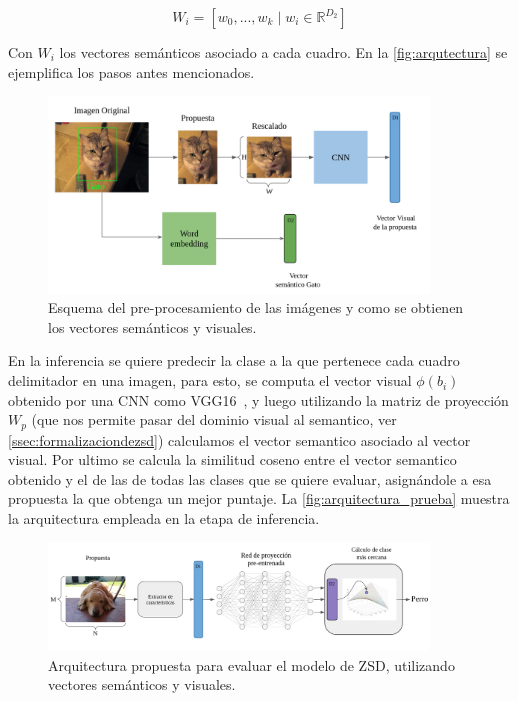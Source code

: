 \[W_i = [w_0,...,w_k \mid w_i \in \mathbb{R}^{D_2}]\]

Con $W_i$ los vectores semánticos asociado a cada cuadro. En la \autoref{fig:arqutectura} se ejemplifica los pasos antes mencionados.


\begin{figure}
	\centering
	\includegraphics[width=0.9\textwidth]{img/arquitectura.png}
	\caption{Esquema del pre-procesamiento de las imágenes y como se obtienen los vectores semánticos y visuales.}
	\label{fig:arqutectura}
\end{figure}


En la inferencia se quiere predecir la clase a la que pertenece cada cuadro delimitador en una imagen, para esto, se computa el vector visual $\phi(b_i)$ obtenido por una CNN como VGG16~\cite{simonyan2014very}, y luego utilizando la matriz de proyección $W_p$ (que nos permite pasar del dominio visual al semantico, ver \autoref{ssec:formalizaciondezsd}) calculamos el vector semantico asociado al vector visual. Por ultimo se calcula la similitud coseno entre el vector semantico obtenido y el de las de todas las clases que se quiere evaluar, asignándole a esa propuesta la que obtenga un mejor puntaje. La \autoref{fig:arquitectura_prueba} muestra la arquitectura empleada en la etapa de inferencia.

\begin{figure}
	\centering
	\includegraphics[width=0.9\textwidth]{img/arquitectura_prueba.png}
	\caption{Arquitectura propuesta para evaluar el modelo de ZSD, utilizando vectores semánticos y visuales.}
	\label{fig:arquitectura_prueba}
\end{figure}

